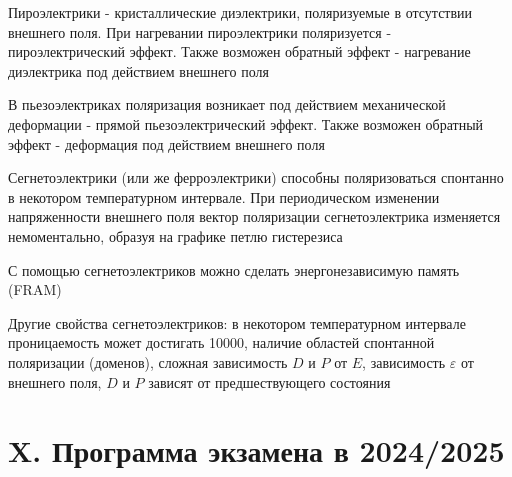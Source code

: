 \documentclass[12pt]{article}
\begin{document}
Пироэлектрики - кристаллические диэлектрики, поляризуемые в отсутствии внешнего поля. При нагревании пироэлектрики поляризуется - пироэлектрический эффект.
Также возможен обратный эффект - нагревание диэлектрика под действием внешнего поля

\mediumvspace

В пьезоэлектриках поляризация возникает под действием механической деформации - прямой пьезоэлектрический эффект. Также 
возможен обратный эффект - деформация под действием внешнего поля

\mediumvspace

Сегнетоэлектрики (или же ферроэлектрики) способны поляризоваться спонтанно в некотором температурном интервале. 
При периодическом изменении напряженности внешнего поля вектор поляризации сегнетоэлектрика изменяется немоментально, 
образуя на графике петлю гистерезиса

С помощью сегнетоэлектриков можно сделать энергонезависимую память (FRAM)

Другие свойства сегнетоэлектриков: в некотором температурном интервале проницаемость может достигать 10000, наличие областей спонтанной поляризации (доменов), 
сложная зависимость $D$ и $P$ от $E$, зависимость $\varepsilon$ от внешнего поля, $D$ и $P$ зависят от предшествующего состояния



    \clearpage

    \section{X. Программа экзамена в 2024/2025}
\end{document}
